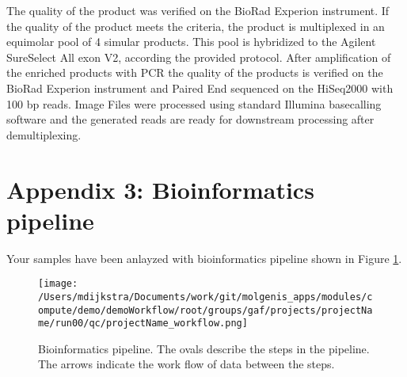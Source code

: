 \documentclass[a4paper,12pt]{article}
\begin{document}
The quality of the product was verified on the BioRad Experion instrument. If the quality of the product meets the criteria, the product is multiplexed in an equimolar pool of 4 simular products. This pool is hybridized to the Agilent SureSelect All exon V2, according the provided protocol. After amplification of the enriched products with PCR the quality of the products is verified on the BioRad Experion instrument and Paired End sequenced on the HiSeq2000 with 100 bp reads. Image Files were processed using standard Illumina basecalling software and the generated reads are ready for downstream processing after demultiplexing.

\clearpage
\section*{Appendix 3: Bioinformatics pipeline}
Your samples have been anlayzed with bioinformatics pipeline shown in Figure \ref{fig:dry}.
\begin{figure}[h]
	\caption{Bioinformatics pipeline. The ovals describe the steps in the pipeline. The arrows indicate the work flow of data between the steps.}
	\begin{center}
		\texttt{[image: /Users/mdijkstra/Documents/work/git/molgenis\_apps/modules/compute/demo/demoWorkflow/root/groups/gaf/projects/projectName/run00/qc/projectName\_workflow.png]}
	\end{center}
	\label{fig:dry}
\end{figure}
\end{document}
